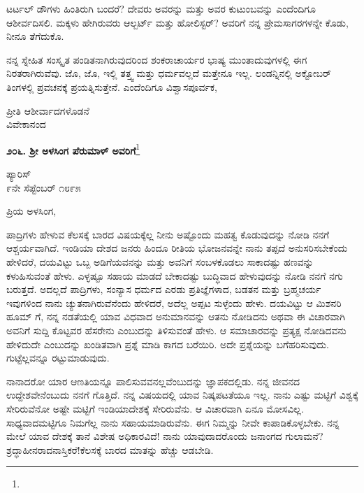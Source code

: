 ಟರ್ಟಲ್ ಡೌಗಳು ಹಿಂತಿರುಗಿ ಬಂದರೆ? ದೇವರು ಅವರನ್ನು ಮತ್ತು ಅವರ ಕುಟುಂಬವನ್ನು ಎಂದೆಂದಿಗೂ ಆಶೀರ್ವದಿಸಲಿ. ಮಕ್ಕಳು ಹೇಗಿರುವರು\enginline{-} ಆಲ್ಬರ್ಟ್ ಮತ್ತು ಹೋಲಿಸ್ಟರ್? ಅವರಿಗೆ ನನ್ನ ಪ್ರೇಮಸಾಗರಗಳನ್ನೇ ಕೊಡು, ನೀನೂ ತೆಗೆದುಕೊ.

ನನ್ನ ಸ್ನೇಹಿತ ಸಂಸ್ಕೃತ ಪಂಡಿತನಾಗಿರುವುದರಿಂದ ಶಂಕರಾಚಾರ್ಯರ ಭಾಷ್ಯ ಮುಂತಾದುವುಗಳಲ್ಲಿ ಈಗ ನಿರತರಾಗಿರುವೆವು. ಜೊ, ಜೊ, ಇಲ್ಲಿ ತತ್ತ್ವ ಮತ್ತು ಧರ್ಮವಲ್ಲದೆ ಮತ್ತೇನೂ ಇಲ್ಲ. ಲಂಡನ್ನಿನಲ್ಲಿ ಅಕ್ಟೋಬರ್ ತಿಂಗಳಲ್ಲಿ ಪ್ರವಚನಕ್ಕೆ ಪ್ರಯತ್ನಿಸುತ್ತೇನೆ. ಎಂದೆಂದಿಗೂ ವಿಶ್ವಾಸಪೂರ್ವಕ,

{\flushright
ಪ್ರೀತಿ ಆಶೀರ್ವಾದಗಳೊಡನೆ\\ವಿವೇಕಾನಂದ\par}

\begin{center}
\textbf{೨೦೬. ಶ‍್ರೀ ಅಳಸಿಂಗ ಪೆರುಮಾಳ್ ಅವರಿಗೆ}\footnote{}
\end{center}

\begin{flushright}
ಪ್ಯಾರಿಸ್\\೯ನೇ ಸೆಪ್ಟೆಂಬರ್ ೧೮೯೫
\end{flushright}

\noindent
ಪ್ರಿಯ ಅಳಸಿಂಗ,

ಪಾದ್ರಿಗಳು ಹೇಳುವ ಕೆಲಸಕ್ಕೆ ಬಾರದ ವಿಷಯಕ್ಕೆಲ್ಲ ನೀನು ಅಷ್ಟೊಂದು ಮಹತ್ವ ಕೊಡುವುದನ್ನು ನೋಡಿ ನನಗೆ ಆಶ್ಚರ್ಯವಾಗಿದೆ. ಇಂಡಿಯಾ ದೇಶದ ಜನರು ಹಿಂದೂ ರೀತಿಯ ಭೋಜನವನ್ನೇ ನಾನು ತಪ್ಪದೆ ಅನುಸರಿಸಬೇಕೆಂದು ಹೇಳಿದರೆ, ದಯವಿಟ್ಟು ಒಬ್ಬ ಅಡಿಗೆಯವನನ್ನು ಮತ್ತು ಅವನಿಗೆ ಸಂಬಳಕೊಡಲು ಸಾಕಾದಷ್ಟು ಹಣವನ್ನು ಕಳುಹಿಸುವಂತೆ ಹೇಳು. ಎಳ್ಳಷ್ಟೂ ಸಹಾಯ ಮಾಡದೆ ಬೇಕಾದಷ್ಟು ಬುದ್ಧಿವಾದ ಹೇಳುವುದನ್ನು ನೋಡಿ ನನಗೆ ನಗು ಬರುತ್ತದೆ. ಅದಲ್ಲದೆ ಪಾದ್ರಿಗಳು, ಸಂನ್ಯಾಸ ಧರ್ಮದ ಎರಡು ಪ್ರತಿಜ್ಞೆಗಳಾದ, ಬಡತನ ಮತ್ತು ಬ್ರಹ್ಮಚರ್ಯ ಇವುಗಳಿಂದ ನಾನು ಚ್ಯುತನಾಗಿರುವೆನೆಂದು ಹೇಳಿದರೆ, ಅದೆಲ್ಲ ಅಪ್ಪಟ ಸುಳ್ಳೆಂದು ಹೇಳು. ದಯವಿಟ್ಟು ಆ ಮಿಶನರಿ ಹೂಮ್ ಗೆ, ನನ್ನ ನಡತೆಯಲ್ಲಿ ಯಾವ ವಿಧವಾದ ಅನುಮಾನವನ್ನು ಆತನು ನೋಡಿದನು ಅಥವಾ ಈ ವಿಚಾರವಾಗಿ ಅವನಿಗೆ ಸುದ್ದಿ ಕೊಟ್ಟವರ ಹೆಸರೇನು ಎಂಬುದನ್ನು ತಿಳಿಸುವಂತೆ ಹೇಳು. ಆ ಸಮಾಚಾರವನ್ನು ಪ್ರತ್ಯಕ್ಷ ನೋಡಿದವನು ಹೇಳಿದುದೇ ಎಂಬುದನ್ನು ಖಂಡಿತವಾಗಿ ಪ್ರಶ್ನೆ ಮಾಡಿ ಕಾಗದ ಬರೆಯಿರಿ. ಅದೇ ಪ್ರಶ್ನೆಯನ್ನು ಬಗೆಹರಿಸುವುದು. ಗುಟ್ಟೆಲ್ಲವನ್ನೂ ರಟ್ಟುಮಾಡುವುದು.

ನಾನಾದರೋ ಯಾರ ಆಣತಿಯನ್ನೂ ಪಾಲಿಸುವವನಲ್ಲವೆಂಬುದನ್ನು ಜ್ಞಾಪಕದಲ್ಲಿಡು. ನನ್ನ ಜೀವನದ ಉದ್ದೇಶವೇನೆಂಬುದು ನನಗೆ ಗೊತ್ತಿದೆ. ನನ್ನ ವಿಷಯದಲ್ಲಿ ಯಾವ ನಿಷ್ಕಪಟತೆಯೂ ಇಲ್ಲ. ನಾನು ಎಷ್ಟು ಮಟ್ಟಿಗೆ ವಿಶ್ವಕ್ಕೆ ಸೇರಿರುವೆನೋ ಅಷ್ಟೇ ಮಟ್ಟಿಗೆ ಇಂಡಿಯಾದೇಶಕ್ಕೆ ಸೇರಿರುವೆನು. ಆ ವಿಚಾರವಾಗಿ ಏನೂ ಮೋಸವಿಲ್ಲ. ಸಾಧ್ಯವಾದಮಟ್ಟಿಗೂ ನಿಮಗೆಲ್ಲ ನಾನು ಸಹಾಯಮಾಡಿರುವೆನು. ಈಗ ನಿಮ್ಮನ್ನು ನೀವೇ ಕಾಪಾಡಿಕೊಳ್ಳಬೇಕು. ನನ್ನ ಮೇಲೆ ಯಾವ ದೇಶಕ್ಕೆ ತಾನೆ ವಿಶೇಷ ಅಧಿಕಾರವಿದೆ! ನಾನು ಯಾವುದಾದರೊಂದು ಜನಾಂಗದ ಗುಲಾಮನೆ? ಶ್ರದ್ಧಾಹೀನರಾದನಾಸ್ತಿಕರೆ!ಕೆಲಸಕ್ಕೆ ಬಾರದ ಮಾತನ್ನು ಹೆಚ್ಚು ಆಡಬೇಡಿ.

\vspace{0.15cm}

